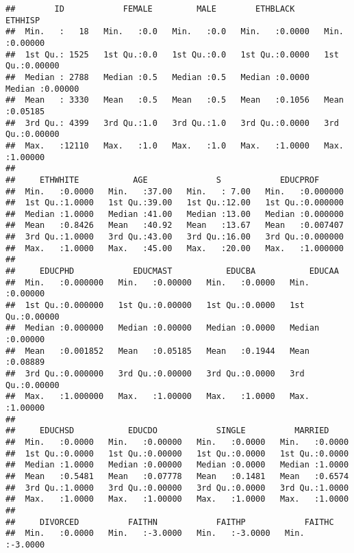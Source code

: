 \documentclass[
]{article}
\begin{document}
\begin{verbatim}
##        ID            FEMALE         MALE        ETHBLACK         ETHHISP       
##  Min.   :   18   Min.   :0.0   Min.   :0.0   Min.   :0.0000   Min.   :0.00000  
##  1st Qu.: 1525   1st Qu.:0.0   1st Qu.:0.0   1st Qu.:0.0000   1st Qu.:0.00000  
##  Median : 2788   Median :0.5   Median :0.5   Median :0.0000   Median :0.00000  
##  Mean   : 3330   Mean   :0.5   Mean   :0.5   Mean   :0.1056   Mean   :0.05185  
##  3rd Qu.: 4399   3rd Qu.:1.0   3rd Qu.:1.0   3rd Qu.:0.0000   3rd Qu.:0.00000  
##  Max.   :12110   Max.   :1.0   Max.   :1.0   Max.   :1.0000   Max.   :1.00000  
##                                                                                
##     ETHWHITE           AGE              S            EDUCPROF       
##  Min.   :0.0000   Min.   :37.00   Min.   : 7.00   Min.   :0.000000  
##  1st Qu.:1.0000   1st Qu.:39.00   1st Qu.:12.00   1st Qu.:0.000000  
##  Median :1.0000   Median :41.00   Median :13.00   Median :0.000000  
##  Mean   :0.8426   Mean   :40.92   Mean   :13.67   Mean   :0.007407  
##  3rd Qu.:1.0000   3rd Qu.:43.00   3rd Qu.:16.00   3rd Qu.:0.000000  
##  Max.   :1.0000   Max.   :45.00   Max.   :20.00   Max.   :1.000000  
##                                                                     
##     EDUCPHD            EDUCMAST           EDUCBA           EDUCAA       
##  Min.   :0.000000   Min.   :0.00000   Min.   :0.0000   Min.   :0.00000  
##  1st Qu.:0.000000   1st Qu.:0.00000   1st Qu.:0.0000   1st Qu.:0.00000  
##  Median :0.000000   Median :0.00000   Median :0.0000   Median :0.00000  
##  Mean   :0.001852   Mean   :0.05185   Mean   :0.1944   Mean   :0.08889  
##  3rd Qu.:0.000000   3rd Qu.:0.00000   3rd Qu.:0.0000   3rd Qu.:0.00000  
##  Max.   :1.000000   Max.   :1.00000   Max.   :1.0000   Max.   :1.00000  
##                                                                         
##     EDUCHSD           EDUCDO            SINGLE          MARRIED      
##  Min.   :0.0000   Min.   :0.00000   Min.   :0.0000   Min.   :0.0000  
##  1st Qu.:0.0000   1st Qu.:0.00000   1st Qu.:0.0000   1st Qu.:0.0000  
##  Median :1.0000   Median :0.00000   Median :0.0000   Median :1.0000  
##  Mean   :0.5481   Mean   :0.07778   Mean   :0.1481   Mean   :0.6574  
##  3rd Qu.:1.0000   3rd Qu.:0.00000   3rd Qu.:0.0000   3rd Qu.:1.0000  
##  Max.   :1.0000   Max.   :1.00000   Max.   :1.0000   Max.   :1.0000  
##                                                                      
##     DIVORCED          FAITHN            FAITHP            FAITHC       
##  Min.   :0.0000   Min.   :-3.0000   Min.   :-3.0000   Min.   :-3.0000  

\end{verbatim}
\end{document}

